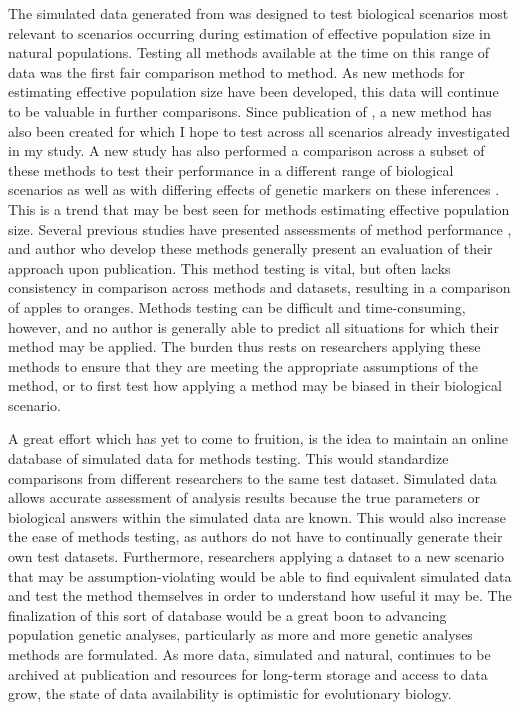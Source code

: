 The simulated data generated from  was designed to test biological scenarios most relevant to scenarios occurring during estimation of effective population size in natural populations. Testing all methods available at the time on this range of data was the first fair comparison method to method. As new methods for estimating effective population size have been developed, this data will continue to be valuable in further comparisons. Since publication of , a new method \citep{Hui:2015} has also been created for which I hope to test across all scenarios already investigated in my study. A new study has also performed a comparison across a subset of these methods to test their performance in a different range of biological scenarios as well as with differing effects of genetic markers on these inferences \citep{Wang:2016}. This is a trend that may be best seen for methods estimating effective population size. Several previous studies have presented assessments of method performance \citep{Ryman:2013, Neel:2013, Holleley:2013, Hoehn:2012, Barker:2011}, and author who develop these methods generally present an evaluation of their approach upon publication. This method testing is vital, but often lacks consistency in comparison across methods and datasets, resulting in a comparison of apples to oranges. Methods testing can be difficult and time-consuming, however, and no author is generally able to predict all situations for which their method may be applied. The burden thus rests on researchers applying these methods to ensure that they are meeting the appropriate assumptions of the method, or to first test how applying a method may be biased in their biological scenario.

A great effort which has yet to come to fruition, is the idea to maintain an online database of simulated data for methods testing. This would standardize comparisons from different researchers to the same test dataset. Simulated data allows accurate assessment of analysis results because the true parameters or biological answers within the simulated data are known. This would also increase the ease of methods testing, as authors do not have to continually generate their own test datasets. Furthermore, researchers applying a dataset to a new scenario that may be assumption-violating would be able to find equivalent simulated data and test the method themselves in order to understand how useful it may be. The finalization of this sort of database would be a great boon to advancing population genetic analyses, particularly as more and more genetic analyses methods are formulated. As more data, simulated and natural, continues to be archived at publication and resources for long-term storage and access to data grow, the state of data availability is optimistic for evolutionary biology.

